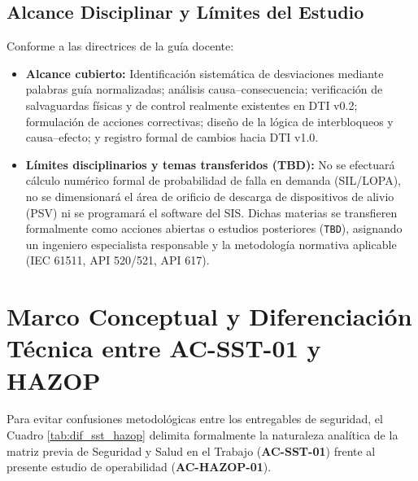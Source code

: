\documentclass[10pt,letterpaper]{article}
\begin{document}
\subsection{Alcance Disciplinar y Límites del Estudio}
Conforme a las directrices de la guía docente:
\begin{itemize}
    \item \textbf{Alcance cubierto:} Identificación sistemática de desviaciones mediante palabras guía normalizadas; análisis causa--consecuencia; verificación de salvaguardas físicas y de control realmente existentes en DTI v0.2; formulación de acciones correctivas; diseño de la lógica de interbloqueos y causa--efecto; y registro formal de cambios hacia DTI v1.0.
    \item \textbf{Límites disciplinarios y temas transferidos (TBD):} No se efectuará cálculo numérico formal de probabilidad de falla en demanda (SIL/LOPA), no se dimensionará el área de orificio de descarga de dispositivos de alivio (PSV) ni se programará el software del SIS. Dichas materias se transfieren formalmente como acciones abiertas o estudios posteriores (\texttt{TBD}), asignando un ingeniero especialista responsable y la metodología normativa aplicable (IEC 61511, API 520/521, API 617).
\end{itemize}
\newpage

\section{Marco Conceptual y Diferenciación Técnica entre AC-SST-01 y HAZOP}
Para evitar confusiones metodológicas entre los entregables de seguridad, el Cuadro \ref{tab:dif_sst_hazop} delimita formalmente la naturaleza analítica de la matriz previa de Seguridad y Salud en el Trabajo (\textbf{AC-SST-01}) frente al presente estudio de operabilidad (\textbf{AC-HAZOP-01}).
\end{document}
